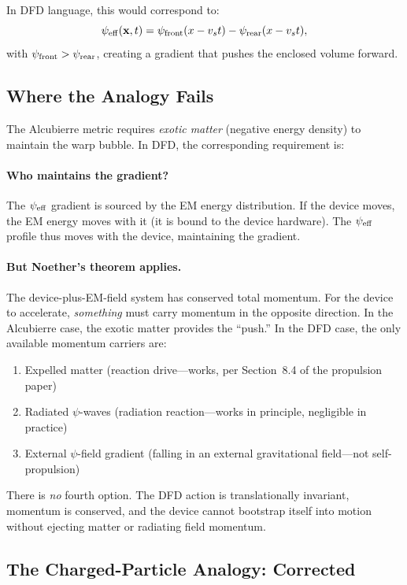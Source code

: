 \documentclass[11pt]{article}
\newcommand{\psieff}{\psi_{\rm eff}}
\begin{document}
In DFD language, this would correspond to:
\begin{equation}
\psieff(\mathbf{x},t) = \psi_{\rm front}(x - v_s t)
- \psi_{\rm rear}(x - v_s t),
\end{equation}
with $\psi_{\rm front} > \psi_{\rm rear}$, creating a gradient that
pushes the enclosed volume forward.

\subsection{Where the Analogy Fails}

The Alcubierre metric requires \emph{exotic matter} (negative energy
density) to maintain the warp bubble. In DFD, the corresponding
requirement is:

\paragraph{Who maintains the gradient?}
The $\psieff$ gradient is sourced by the EM energy distribution. If the
device moves, the EM energy moves with it (it is bound to the device
hardware). The $\psieff$ profile thus moves with the device, maintaining
the gradient.

\paragraph{But Noether's theorem applies.}
The device-plus-EM-field system has conserved total momentum. For the
device to accelerate, \emph{something} must carry momentum in the opposite
direction. In the Alcubierre case, the exotic matter provides the ``push.''
In the DFD case, the only available momentum carriers are:
\begin{enumerate}
\item Expelled matter (reaction drive---works, per Section~8.4 of the
  propulsion paper)
\item Radiated $\psi$-waves (radiation reaction---works in principle,
  negligible in practice)
\item External $\psi$-field gradient (falling in an external
  gravitational field---not self-propulsion)
\end{enumerate}

There is \emph{no} fourth option. The DFD action is translationally
invariant, momentum is conserved, and the device cannot bootstrap itself
into motion without ejecting matter or radiating field momentum.

\subsection{The Charged-Particle Analogy: Corrected}
\end{document}
